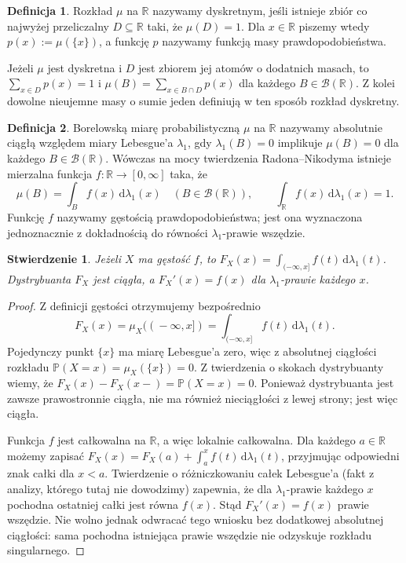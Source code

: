 \documentclass[11pt,a4paper,oneside]{report}
\numberwithin{equation}{chapter}
\theoremstyle{plain}
\newtheorem{stwierdzenie}[twierdzenie]{Stwierdzenie}
\theoremstyle{definition}
\newtheorem{definicja}{Definicja}[chapter]
\theoremstyle{remark}
\newcommand{\R}{\mathbb{R}}
\newcommand{\Prob}{\mathbb{P}}
\newcommand{\dd}{\mathrm{d}}
\begin{document}
\begin{definicja}
Rozkład $\mu$ na $\R$ nazywamy dyskretnym, jeśli istnieje zbiór
co najwyżej przeliczalny $D\subseteq\R$ taki, że $\mu(D)=1$.
Dla $x\in\R$ piszemy wtedy $p(x):=\mu(\{x\})$, a funkcję $p$
nazywamy funkcją masy prawdopodobieństwa.
\end{definicja}

Jeżeli $\mu$ jest dyskretna i $D$ jest zbiorem jej atomów o dodatnich
masach, to $\sum_{x\in D}p(x)=1$ i
$\mu(B)=\sum_{x\in B\cap D}p(x)$ dla każdego $B\in\mathcal B(\R)$.
Z kolei dowolne nieujemne masy o sumie jeden definiują w ten sposób
rozkład dyskretny.

\begin{definicja}
Borelowską miarę probabilistyczną $\mu$ na $\R$ nazywamy
absolutnie ciągłą względem miary Lebesgue'a $\lambda_1$,
gdy $\lambda_1(B)=0$ implikuje $\mu(B)=0$ dla każdego
$B\in\mathcal B(\R)$. Wówczas na mocy twierdzenia Radona--Nikodyma
istnieje mierzalna funkcja $f:\R\to[0,\infty]$ taka, że
\begin{equation}\label{eq:density}
\mu(B)=\int_B f(x)\,\dd\lambda_1(x)
\quad(B\in\mathcal B(\R)),\qquad
\int_\R f(x)\,\dd\lambda_1(x)=1.
\end{equation}
Funkcję $f$ nazywamy gęstością prawdopodobieństwa; jest ona
wyznaczona jednoznacznie z dokładnością do równości
$\lambda_1$-prawie wszędzie.
\end{definicja}

\begin{stwierdzenie}
Jeżeli $X$ ma gęstość $f$, to
$F_X(x)=\int_{(-\infty,x]} f(t)\,\dd\lambda_1(t)$.
Dystrybuanta $F_X$ jest ciągła, a $F_X'(x)=f(x)$
dla $\lambda_1$-prawie każdego $x$.
\end{stwierdzenie}
\begin{proof}
Z definicji gęstości otrzymujemy bezpośrednio
\[
F_X(x)=\mu_X((\!-\infty,x])
=\int_{(-\infty,x]}f(t)\,\dd\lambda_1(t).
\]
Pojedynczy punkt $\{x\}$ ma miarę Lebesgue'a zero,
więc z absolutnej ciągłości rozkładu
$\Prob(X=x)=\mu_X(\{x\})=0$.
Z twierdzenia o skokach dystrybuanty wiemy,
że $F_X(x)-F_X(x-)=\Prob(X=x)=0$.
Ponieważ dystrybuanta jest zawsze prawostronnie ciągła,
nie ma również nieciągłości z lewej strony; jest więc ciągła.

Funkcja $f$ jest całkowalna na $\R$, a więc lokalnie
całkowalna. Dla każdego $a\in\R$ możemy zapisać
$F_X(x)=F_X(a)+\int_a^x f(t)\,\dd\lambda_1(t)$,
przyjmując odpowiedni znak całki dla $x<a$.
Twierdzenie o różniczkowaniu całek Lebesgue'a
(fakt z analizy, którego tutaj nie dowodzimy) zapewnia,
że dla $\lambda_1$-prawie każdego $x$ pochodna ostatniej
całki jest równa $f(x)$. Stąd $F_X'(x)=f(x)$ prawie wszędzie.
Nie wolno jednak odwracać tego wniosku bez dodatkowej
absolutnej ciągłości: sama pochodna istniejąca prawie
wszędzie nie odzyskuje rozkładu singularnego.
\end{proof}
\end{document}

